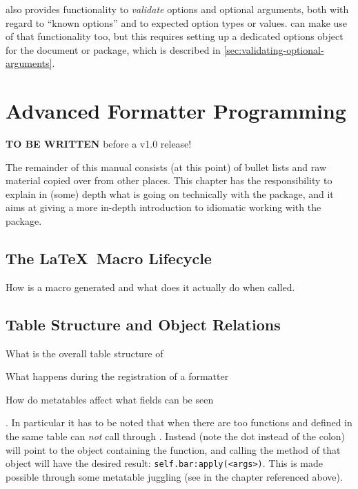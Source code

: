 \documentclass{scrartcl}
\begin{document}
 also provides functionality to \emph{validate} options
and optional arguments, both with regard to “known options” and to expected
option types or values.   can make use of that
functionality too, but this requires setting up a dedicated options object for
the document or package, which is described in
\vref{sec:validating-optional-arguments}.


\section{Advanced Formatter Programming}
\label{sec:advanced-programming}

\textbf{TO BE WRITTEN} before a v1.0 release!

The remainder of this manual consists (at this point) of bullet lists and raw material copied over from other places. This chapter has the responsibility to explain in (some) depth what is going on technically with the package, and it aims at giving a more in-depth introduction to idiomatic working with the package.



\subsection{The \LaTeX\ Macro Lifecycle}
\label{sec:latex-macro-lifecycle}

How is a macro generated and what does it actually do when called.

\subsection{Table Structure and Object Relations}
\label{sec:table-structure-object-relations}

\begin{itemize*}
\item What is the overall table structure of 
\item What happens during the registration of a formatter
\item How do metatables affect what fields can be seen
\end{itemize*}


.  In particular
it has to be noted that when there are too functions  and
 defined in the same  table  can
\emph{not} call  through .  Instead
 (note the dot instead of the colon) will point to the
 object containing the  function, and calling
the  method of that object will have the desired result:
\texttt{self.bar:apply(<args>)}.  This is made possible through some
metatable juggling (see in the chapter referenced above).
\end{document}
